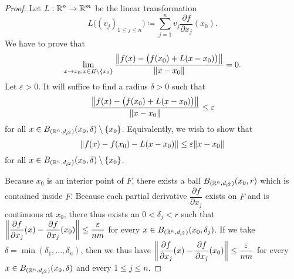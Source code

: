\begin{proof}
  Let \(L : \R^n \to \R^m\) be the linear transformation
  \[
    L\big((v_j)_{1 \leq j \leq n}\big) \coloneqq \sum_{j = 1}^n v_j \dfrac{\partial f}{\partial x_j}(x_0).
  \]
  We have to prove that
  \[
    \lim_{x \to x_0 ; x \in E \setminus \set{x_0}} \dfrac{\norm*{f(x) - \big(f(x_0) + L(x - x_0)\big)}}{\norm*{x - x_0}} = 0.
  \]
  Let \(\varepsilon > 0\).
  It will suffice to find a radius \(\delta > 0\) such that
  \[
    \dfrac{\norm*{f(x) - \big(f(x_0) + L(x - x_0)\big)}}{\norm*{x - x_0}} \leq \varepsilon
  \]
  for all \(x \in B_{(\R^n, d_{l^2})}(x_0, \delta) \setminus \set{x_0}\).
  Equivalently, we wish to show that
  \[
    \norm*{f(x) - f(x_0) - L(x - x_0)} \leq \varepsilon \norm*{x - x_0}
  \]
  for all \(x \in B_{(\R^n, d_{l^2})}(x_0, \delta) \setminus \set{x_0}\).

  Because \(x_0\) is an interior point of \(F\), there exists a ball \(B_{(\R^n, d_{l^2})}(x_0, r)\) which is contained inside \(F\).
  Because each partial derivative \(\dfrac{\partial f}{\partial x_j}\) exists on \(F\) and is continuous at \(x_0\), there thus exists an \(0 < \delta_j < r\) such that \(\norm*{\dfrac{\partial f}{\partial x_j}(x) - \dfrac{\partial f}{\partial x_j}(x_0)} \leq \dfrac{\varepsilon}{nm}\) for every \(x \in B_{(\R^n, d_{l^2})}(x_0, \delta_j)\).
  If we take \(\delta = \min(\delta_1, \dots, \delta_n)\), then we thus have \(\norm*{\dfrac{\partial f}{\partial x_j}(x) - \dfrac{\partial f}{\partial x_j}(x_0)} \leq \dfrac{\varepsilon}{nm}\) for every \(x \in B_{(\R^n, d_{l^2})}(x_0, \delta)\) and every \(1 \leq j \leq n\).


\end{proof}
